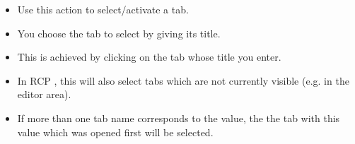 \begin{itemize}
\item Use this action to select/activate a tab.
\item You choose the tab to select by giving its title.
\item This is achieved by clicking on the tab whose title you enter.
\item In RCP \gdauts{}, this will also select tabs which are not currently visible (e.g. in the editor area). 
\item If more than one tab name corresponds to the value, the the tab with this value which was opened first will be selected.  
\end{itemize}
  
    
